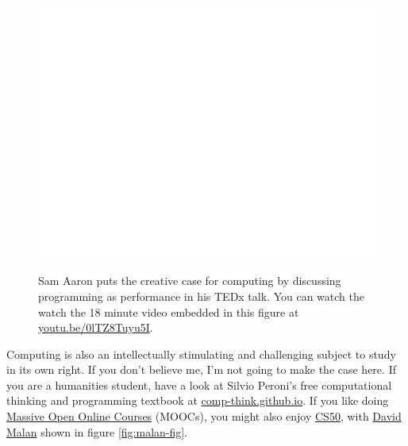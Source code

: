 \documentclass[
]{book}
\begin{document}
\begin{figure}

{\centering \href{https://www.youtube.com/embed/0lTZ8Tuyu5I}{\includegraphics[width=1\linewidth]{cdyf_files/figure-latex/sonicpi-fig-1} }

}

\caption{Sam Aaron puts the creative case for computing by discussing programming as performance in his TEDx talk. You can watch the watch the 18 minute video embedded in this figure at \href{https://youtu.be/0lTZ8Tuyu5I}{youtu.be/0lTZ8Tuyu5I}. \citep{youtube-sonicpi}}\label{fig:sonicpi-fig}
\end{figure}



Computing is also an intellectually stimulating and challenging subject to study in its own right. If you don't believe me, I'm not going to make the case here. If you are a humanities student, have a look at Silvio Peroni's free computational thinking and programming textbook at \href{https://comp-think.github.io/}{comp-think.github.io}. \citep{peroni} If you like doing \href{https://en.wikipedia.org/wiki/Massive_open_online_course}{Massive Open Online Courses} (MOOCs), you might also enjoy \href{https://en.wikipedia.org/wiki/CS50}{CS50}, with \href{https://en.wikipedia.org/wiki/David_J._Malan}{David Malan} shown in figure \ref{fig:malan-fig}.
\end{document}
